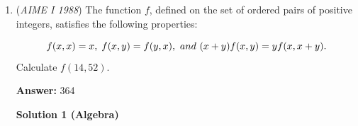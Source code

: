 \begin{enumerate}
 
 \textbf{Answer: }110



\textbf{Solution}

<a href="/wiki/index.php?title=File:AIME\_1988\_Solution\_07.png" title="File:AIME 1988 Solution 07.png">Error creating thumbnail: Unable to save thumbnail to destination</a>

 Call $\angle BAD$ $\alpha$ and $\angle CAD$ $\beta$. So, $\tan \alpha = \frac {17}{h}$ and $\tan \beta = \frac {3}{h}$. Using the tangent addition formula $\tan (\alpha + \beta) = \dfrac {\tan \alpha + \tan \beta}{1 - \tan \alpha \cdot \tan \beta}$, we get $\tan (\alpha + \beta) = \dfrac {\frac {20}{h}}{\frac {h^2 - 51}{h^2}} = \frac {22}{7}$. 

 Simplifying, we get $\frac {20h}{h^2 - 51} = \frac {22}{7}$. Cross-multiplying and simplifying, we get $11h^2-70h-561 = 0$. Factoring, we get $(11h+51)(h-11) = 0$, so we take the positive positive solution, which is $h = 11$. Therefore, the answer is $\frac {20 \cdot 11}{2} = 110$, so the answer is $\boxed {110}$.

 


	\item (\textit{AIME I 1988}) The function $f$, defined on the set of ordered pairs of positive integers, satisfies the following properties:

 \[f(x, x) = x,\; f(x, y) = f(y, x), {\textrm \ and\ } (x+y)f(x, y) = yf(x, x+y).\]
Calculate $f(14,52)$.


 
 \textbf{Answer: }364



\textbf{Solution 1 (Algebra)}


\end{enumerate}
